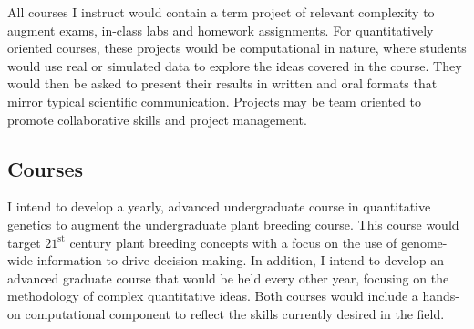 \documentclass[11pt]{article}
\begin{document}
All courses I instruct would contain a term project of relevant complexity to augment exams, in-class labs and homework assignments. For quantitatively oriented courses, these projects would be computational in nature, where students would use real or simulated data to explore the ideas covered in the course. They would then be asked to present their results in written and oral formats that mirror typical scientific communication. Projects may be team oriented to promote collaborative skills and project management. %



\subsection*{Courses}

I intend to develop a yearly, advanced undergraduate course in quantitative genetics to augment the undergraduate plant breeding course. This course would target $21^\text{st}$ century plant breeding concepts with a focus on the use of genome-wide information to drive decision making. In addition, I intend to develop an advanced graduate course that would be held every other year, focusing on the methodology of complex quantitative ideas. Both courses would include a hands-on computational component to reflect the skills currently desired in the field.

\end{document}

